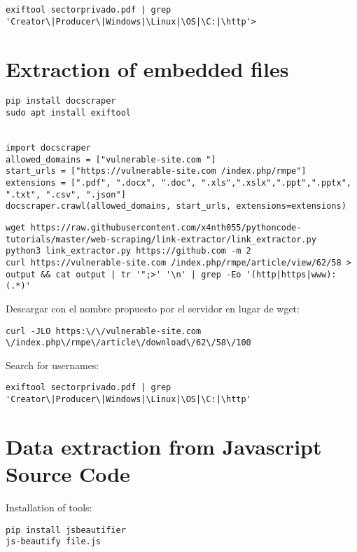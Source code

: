 \begin{lstlisting}[numbers=none]
exiftool sectorprivado.pdf | grep 'Creator\|Producer\|Windows|\Linux|\OS|\C:|\http'>
\end{lstlisting}

\section{Extraction of embedded files}

\begin{lstlisting}[numbers=none]
pip install docscraper 
sudo apt install exiftool


import docscraper 
allowed_domains = ["vulnerable-site.com "]
start_urls = ["https://vulnerable-site.com /index.php/rmpe"]
extensions = [".pdf", ".docx", ".doc", ".xls",".xslx",".ppt",".pptx", ".txt", ".csv", ".json"]
docscraper.crawl(allowed_domains, start_urls, extensions=extensions)
\end{lstlisting}

\begin{lstlisting}[numbers=none]
wget https://raw.githubusercontent.com/x4nth055/pythoncode-tutorials/master/web-scraping/link-extractor/link_extractor.py
python3 link_extractor.py https://github.com -m 2
curl https://vulnerable-site.com /index.php/rmpe/article/view/62/58 > output && cat output | tr '";>' '\n' | grep -Eo '(http|https|www):(.*)'
\end{lstlisting}

Descargar con el nombre propuesto por el servidor en lugar de wget:
\begin{lstlisting}[numbers=none]
curl -JLO https:\/\/vulnerable-site.com \/index.php\/rmpe\/article\/download\/62\/58\/100
\end{lstlisting}

Search for usernames:
\begin{lstlisting}[numbers=none]
exiftool sectorprivado.pdf | grep 'Creator\|Producer\|Windows|\Linux|\OS|\C:|\http'
\end{lstlisting}


\section{Data extraction from Javascript Source Code}

Installation of tools:
\begin{lstlisting}[numbers=none]
pip install jsbeautifier
js-beautify file.js
\end{lstlisting}
	
